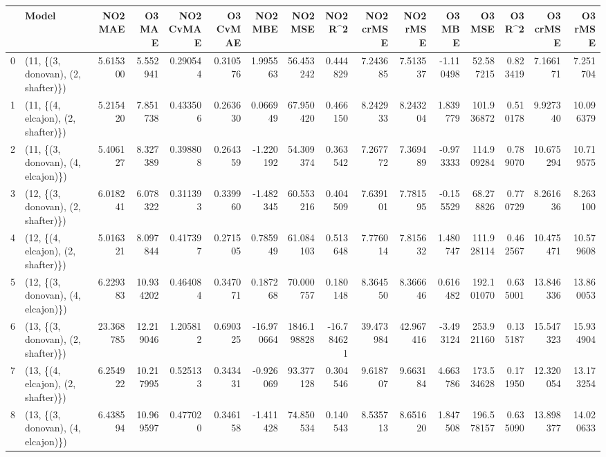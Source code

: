 \begin{tabular}{llrrrrrrrrrrrrrr}
\toprule
{} &                               Model &    NO2 MAE &     O3 MAE &  NO2 CvMAE &  O3 CvMAE &    NO2 MBE &      NO2 MSE &    NO2 R\textasciicircum2 &  NO2 crMSE &   NO2 rMSE &     O3 MBE &      O3 MSE &    O3 R\textasciicircum2 &   O3 crMSE &    O3 rMSE \\
\midrule
0  &  (11, \{(3, donovan), (2, shafter)\}) &   5.615300 &   5.552941 &   0.290544 &  0.310576 &   1.995563 &    56.453242 &   0.444829 &   7.243685 &   7.513537 &  -1.110498 &   52.587215 &  0.823419 &   7.166171 &   7.251704 \\
1  &  (11, \{(4, elcajon), (2, shafter)\}) &   5.215420 &   7.851738 &   0.433506 &  0.263630 &   0.066949 &    67.950420 &   0.466150 &   8.242933 &   8.243204 &   1.839779 &  101.936872 &  0.510178 &   9.927340 &  10.096379 \\
2  &  (11, \{(3, donovan), (4, elcajon)\}) &   5.406127 &   8.327389 &   0.398808 &  0.264359 &  -1.220192 &    54.309374 &   0.363542 &   7.267772 &   7.369489 &  -0.973333 &  114.909284 &  0.789070 &  10.675294 &  10.719575 \\
3  &  (12, \{(3, donovan), (2, shafter)\}) &   6.018241 &   6.078322 &   0.311393 &  0.339960 &  -1.482345 &    60.553216 &   0.404509 &   7.639101 &   7.781595 &  -0.155529 &   68.278826 &  0.770729 &   8.261636 &   8.263100 \\
4  &  (12, \{(4, elcajon), (2, shafter)\}) &   5.016321 &   8.097844 &   0.417397 &  0.271505 &   0.785949 &    61.084103 &   0.513648 &   7.776014 &   7.815632 &   1.480747 &  111.928114 &  0.462567 &  10.475471 &  10.579608 \\
5  &  (12, \{(3, donovan), (4, elcajon)\}) &   6.229383 &  10.934202 &   0.464084 &  0.347071 &   0.187268 &    70.000757 &   0.180148 &   8.364550 &   8.366646 &   0.616482 &  192.101070 &  0.635001 &  13.846336 &  13.860053 \\
6  &  (13, \{(3, donovan), (2, shafter)\}) &  23.368785 &  12.219046 &   1.205812 &  0.690325 & -16.970664 &  1846.198828 & -16.784621 &  39.473984 &  42.967416 &  -3.493124 &  253.921160 &  0.135187 &  15.547323 &  15.934904 \\
7  &  (13, \{(4, elcajon), (2, shafter)\}) &   6.254922 &  10.217995 &   0.525133 &  0.343431 &  -0.926069 &    93.377128 &   0.304546 &   9.618707 &   9.663184 &   4.663786 &  173.534628 &  0.171950 &  12.320054 &  13.173254 \\
8  &  (13, \{(3, donovan), (4, elcajon)\}) &   6.438594 &  10.969597 &   0.477020 &  0.346158 &  -1.411428 &    74.850534 &   0.140543 &   8.535713 &   8.651620 &   1.847508 &  196.578157 &  0.635090 &  13.898377 &  14.020633 \\

\end{tabular}

